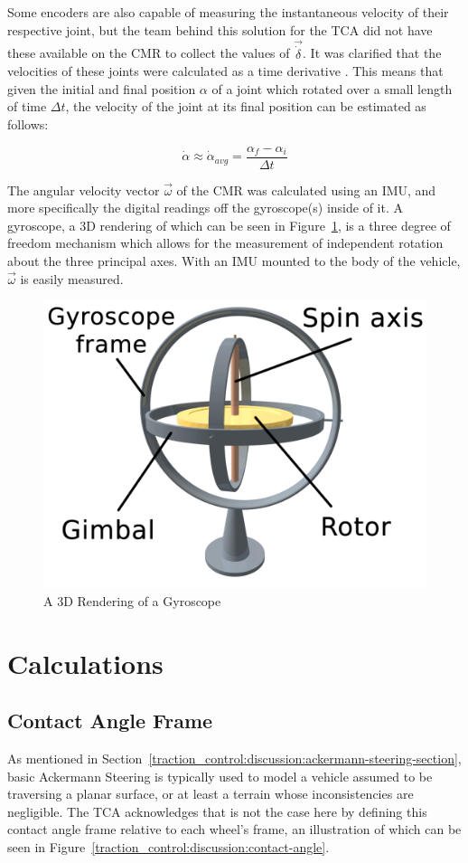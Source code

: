 Some encoders are also capable of measuring the instantaneous velocity of their respective joint, but the team behind this solution for the \ac{TCA} did not have these available on the \ac{CMR} to collect the values of $\vec{\dot{\delta}}$. It was clarified that the velocities of these joints were calculated as a time derivative \cite{tractl}. This means that given the initial and final position $\alpha$ of a joint which rotated over a small length of time $\Delta t$, the velocity of the joint at its final position can be estimated as follows:

\begin{equation}
\dot{\alpha} \approx \dot{\alpha}_{avg} = \frac{\alpha_{f} - \alpha_{i}}{\Delta t}
\end{equation}

The angular velocity vector $\vec{\omega}$ of the \ac{CMR} was calculated using an \ac{IMU}, and more specifically the digital readings off the gyroscope(s) inside of it. A gyroscope, a 3D rendering of which can be seen in Figure~\ref{traction_control:discussion:gyro}, is a three degree of freedom mechanism which allows for the measurement of independent rotation about the three principal axes. With an \ac{IMU} mounted to the body of the vehicle, $\vec{\omega}$ is easily measured.

\begin{figure}[htbp]
	\centering
	\includegraphics[width=.5\textwidth]{sections/discussion/images/gyroscope.png}
	\caption{A 3D Rendering of a Gyroscope}
	\label{traction_control:discussion:gyro}
\end{figure}

\section{Calculations}
\subsection{Contact Angle Frame}\label{traction_control:discussion:contact-angle-section}
As mentioned in Section~\ref{traction_control:discussion:ackermann-steering-section}, basic Ackermann Steering is typically used to model a vehicle assumed to be traversing a planar surface, or at least a terrain whose inconsistencies are negligible. The \ac{TCA} acknowledges that is not the case here by defining this contact angle frame relative to each wheel's frame, an illustration of which can be seen in Figure~\ref{traction_control:discussion:contact-angle}.

